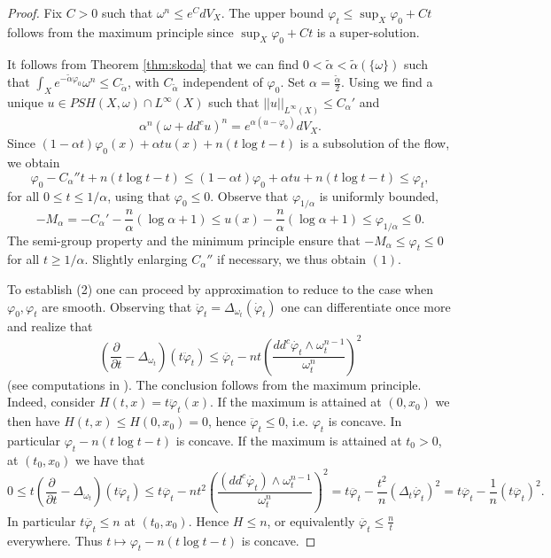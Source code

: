 \documentclass[10pt,a4paper]{amsart}
\numberwithin{equation}{section}
\newcommand{\f}{\varphi}
\begin{document}
\begin{proof}
Fix $C>0$ such that $\omega^n \leq e^C dV_X$.
The upper bound $\f_t \leq \sup_X \f_0+Ct$ follows  from the maximum principle since $\sup_X \f_0+Ct$ is a super-solution.

It follows from Theorem \ref{thm:skoda} that we can find $0 < \tilde{\alpha} < \tilde{\alpha}(\{\omega\})$ 
such that $\int_X e^{-\tilde{\alpha} \f_0} \omega^n \leq C_{\tilde{\alpha}}$, with
$C_{\tilde{\alpha}}$ independent of $\f_0$. Set $\alpha= \frac{\tilde{\alpha}}{2}$. Using \cite[Corollary 11.9 and Theorem 12.1]{GZbook} 
we find a unique $u \in PSH(X,\omega) \cap L^{\infty}(X)$ such that
$||u||_{L^{\infty}(X)} \leq C_{\alpha}'$ and
$$
\alpha^n (\omega+dd^c u)^n=e^{\alpha (u-\f_0)} dV_X.
$$
Since  $(1-\alpha t) \f_0(x)+\alpha t u(x) +n(t\log t-t)$ is a subsolution of the flow,
we obtain
\begin{equation}\label{C0 esti}
\f_0-C_{\alpha}''t  +n(t\log  t-t) \leq
(1-\alpha t) \f_0+\alpha t u +n(t\log  t-t) \leq \f_t,
\end{equation}
for all $0 \leq t \leq 1/\alpha$, using that $\f_0 \leq 0$. 
Observe that $\f_{1/\alpha}$ is uniformly bounded,
$$
-M_{\alpha}=-C_{\alpha}'-\frac{n}{\alpha}(\log \alpha +1) \leq
u(x)-\frac{n}{\alpha}(\log \alpha +1) \leq \f_{1/\alpha} \leq 0.
$$
The semi-group property and the minimum principle ensure that 
$-M_{\alpha} \leq \f_t \leq 0$ for all $t \geq 1/ \alpha$.
Slightly enlarging $C_{\alpha}''$ if necessary, we thus obtain $(1)$.

\smallskip

To establish (2) one can proceed by approximation to reduce to the case when $\f_0,\f_t$ are smooth.
Observing that $\ddot{\f}_t=\Delta_{\omega_t}(\dot{\f}_t)$ one can differentiate once more and realize that
$$
\left( \frac{\partial}{\partial t}-\Delta_{\omega_t} \right)(t \ddot{\f}_t) \leq \ddot{\f_t} - nt \left( \frac{dd^c \dot{\varphi_t} \wedge \omega_t^{n-1}}{\omega_t^n}\right)^2
$$
(see computations in \cite[Theorem 2.7]{GLZ20}). The conclusion follows from the maximum principle. Indeed, consider $H(t,x)=t \ddot{\f}_t(x)$. If the maximum is attained at $(0, x_0)$ we then have $H(t,x)\leq H(0, x_0)=0$, hence $ \ddot{\f}_t \leq 0$, i.e. $\f_t $ is concave. In particular $\f_t-n(t\log t -t)$ is concave. If the maximum is attained at $t_0>0$, at $(t_0, x_0)$ we have that $$0\leq t\left( \frac{\partial}{\partial t}-\Delta_{\omega_t} \right)(t \ddot{\f}_t) \leq t\ddot{\f_t} - nt^2 \left( \frac{(dd^c \dot{\varphi_t}) \wedge \omega_t^{n-1}}{\omega_t^n}\right)^2 = t\ddot{\f_t} -\frac{t^2}{n} (\Delta_t \dot{\f_t})^2=  t\ddot{\f_t} -\frac{1}{n} (t\ddot{\f_t})^2.$$
In particular $t\ddot{\f_t} \leq n$ at $(t_0, x_0)$. Hence $H\leq n$, or equivalently $\ddot{\f_t} \leq \frac{n}{t}$ everywhere. Thus $t \mapsto \varphi_t - n (t\log t-t)$ is concave.


\end{proof}
\end{document}
